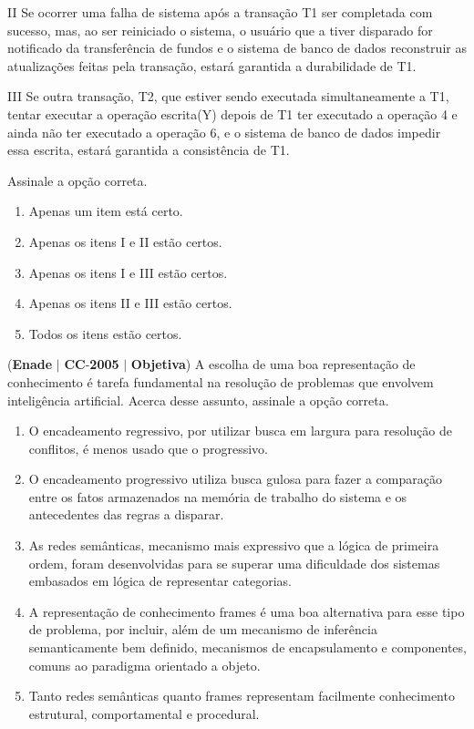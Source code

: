 \documentclass{exam}
\begin{document}
\begin{questions}
II Se ocorrer uma falha de sistema após a transação T1 ser
completada com sucesso, mas, ao ser reiniciado o sistema, o
usuário que a tiver disparado for notificado da transferência
de fundos e o sistema de banco de dados reconstruir as
atualizações feitas pela transação, estará garantida a
durabilidade de T1. 

III Se outra transação, T2, que estiver sendo executada
simultaneamente a T1, tentar executar a operação
escrita(Y) depois de T1 ter executado a operação 4 e
ainda não ter executado a operação 6, e o sistema de banco
de dados impedir essa escrita, estará garantida a consistência
de T1.

Assinale a opção correta.
	\begin{enumerate}[label=\alph*)]
		\item  Apenas um item está certo.
		\item  Apenas os itens I e II estão certos.
		\item  Apenas os itens I e III estão certos.
		\item  Apenas os itens II e III estão certos.
		\item  Todos os itens estão certos.
	\end{enumerate}

\question (\textbf{Enade} $|$ \textbf{CC}-\textbf{2005} $|$ \textbf{Objetiva})
A escolha de uma boa representação de conhecimento é tarefa
fundamental na resolução de problemas que envolvem
inteligência artificial. Acerca desse assunto, assinale a opção
correta.
	\begin{enumerate}[label=\alph*)]
		\item  O encadeamento regressivo, por utilizar busca em largura
para resolução de conflitos, é menos usado que o progressivo.
		\item  O encadeamento progressivo utiliza busca gulosa para fazer
a comparação entre os fatos armazenados na memória de
trabalho do sistema e os antecedentes das regras a disparar.
		\item  As redes semânticas, mecanismo mais expressivo que a
lógica de primeira ordem, foram desenvolvidas para se
superar uma dificuldade dos sistemas embasados em lógica
de representar categorias.
		\item  A representação de conhecimento frames é uma boa
alternativa para esse tipo de problema, por incluir, além de
um mecanismo de inferência semanticamente bem definido,
mecanismos de encapsulamento e componentes, comuns ao
paradigma orientado a objeto.
		\item  Tanto redes semânticas quanto frames representam
facilmente conhecimento estrutural, comportamental e
procedural.
	\end{enumerate}


\end{questions}
\end{document}
